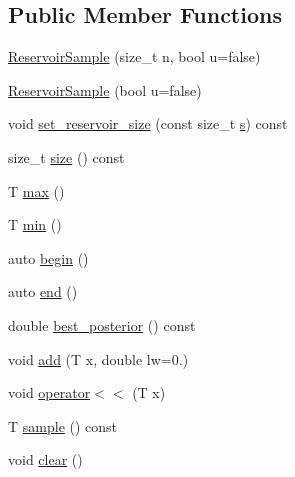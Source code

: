 \subsection*{Public Member Functions}
\begin{DoxyCompactItemize}
\item 
\hyperlink{class_fleet_1_1_statistics_1_1_reservoir_sample_a0dde0cb8cfbb14a0bbf8db7f4bb316e9}{Reservoir\+Sample} (size\+\_\+t n, bool u=false)
\item 
\hyperlink{class_fleet_1_1_statistics_1_1_reservoir_sample_a39c8b405654eaca4c943263a485bc015}{Reservoir\+Sample} (bool u=false)
\item 
void \hyperlink{class_fleet_1_1_statistics_1_1_reservoir_sample_adabe7f40c91657950a67df7d20ace543}{set\+\_\+reservoir\+\_\+size} (const size\+\_\+t \hyperlink{class_fleet_1_1_statistics_1_1_reservoir_sample_a7cf0266d882988e2a61b857d123c8b58}{s}) const
\item 
size\+\_\+t \hyperlink{class_fleet_1_1_statistics_1_1_reservoir_sample_abdfad455c8b8da8cb2ab30d0f60053e0}{size} () const
\item 
T \hyperlink{class_fleet_1_1_statistics_1_1_reservoir_sample_af2d03d8d0e93ddedc61a43d1827ae48d}{max} ()
\item 
T \hyperlink{class_fleet_1_1_statistics_1_1_reservoir_sample_ab2f186b828351e164e1ed6e60c8c9be8}{min} ()
\item 
auto \hyperlink{class_fleet_1_1_statistics_1_1_reservoir_sample_af441a020b7a7244e9ca56c8d293fb59a}{begin} ()
\item 
auto \hyperlink{class_fleet_1_1_statistics_1_1_reservoir_sample_a4e3cf1195fcb255f2b0281d9307bfd16}{end} ()
\item 
double \hyperlink{class_fleet_1_1_statistics_1_1_reservoir_sample_aa802a85955db2941b99851f3b98e5252}{best\+\_\+posterior} () const
\item 
void \hyperlink{class_fleet_1_1_statistics_1_1_reservoir_sample_a374930296f502c957a925a5f7ba9087b}{add} (T x, double lw=0.)
\item 
void \hyperlink{class_fleet_1_1_statistics_1_1_reservoir_sample_ad6e4d50ef1acefce7f5d66013720c1ef}{operator$<$$<$} (T x)
\item 
T \hyperlink{class_fleet_1_1_statistics_1_1_reservoir_sample_a1b66a8f27512ebd6a48370621a43db87}{sample} () const
\item 
void \hyperlink{class_fleet_1_1_statistics_1_1_reservoir_sample_aadf45c574db6a4ab93da3df2b3f1df03}{clear} ()
\end{DoxyCompactItemize}
